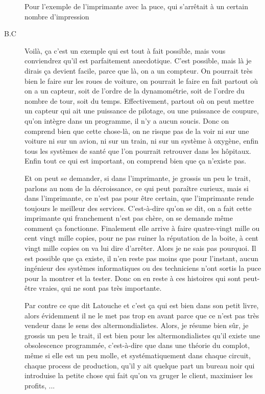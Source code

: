 \begin{description}
Pour l'exemple de l'imprimante avec la puce, qui s'arrêtait à un certain nombre d'impression

\vspace{1\baselineskip}

\item[B.C]Voilà, ça c'est un exemple qui est tout à fait possible, mais vous conviendrez qu'il est parfaitement anecdotique. C'est possible, mais là je dirais ça devient facile, parce que là, on a un compteur. On pourrait très bien le faire sur les roues de voiture, on pourrait le faire en fait partout où on a un capteur, soit de l'ordre de la dynamométrie, soit de l'ordre du nombre de tour, soit du temps. Effectivement, partout où on peut mettre un capteur qui ait une puissance de pilotage, ou une puissance de coupure, qu'on intègre dans un programme, il n'y a aucun soucis. Donc on comprend bien que cette chose-là, on ne risque pas de la voir ni sur une voiture ni sur un avion, ni sur un train, ni sur un système à oxygène, enfin tous les systèmes de santé que l'on pourrait retrouver dans les hôpitaux. Enfin tout ce qui est important, on comprend bien que ça n'existe pas.

Et on peut se demander, si dans l'imprimante, je grossis un peu le trait, parlons au nom de la décroissance, ce qui peut paraître curieux, mais si dans l'imprimante, ce n'est pas pour être certain, que l'imprimante rende toujours le meilleur des services. C'est-à-dire qu'on se dit, on a fait cette imprimante qui franchement n'est pas chère, on se demande même comment ça fonctionne. Finalement elle arrive à faire quatre-vingt mille ou cent vingt mille copies, pour ne pas ruiner la réputation de la boite, à cent vingt mille copies on va lui dire d'arrêter. Alors je ne sais pas pourquoi. Il est possible que ça existe, il n'en reste pas moins que pour l'instant, aucun ingénieur des systèmes informatiques ou des techniciens n'ont sortis la puce pour la montrer et la tester. Donc on en reste à ces histoires qui sont peut-être vraies, qui ne sont pas très importante. 

Par contre ce que dit Latouche et c'est ça qui est bien dans son petit livre, alors évidemment il ne le met pas trop en avant parce que ce n’est pas très vendeur dans le sens des altermondialistes. Alors, je résume bien sûr, je grossis un peu le trait, il est bien pour les altermondialistes qu'il existe une obsolescence programmée, c'est-à-dire que dans une théorie du complot, même si elle est un peu molle, et systématiquement dans chaque circuit, chaque process de production, qu'il y ait quelque part un bureau noir qui introduise la petite chose qui fait qu'on va gruger le client, maximiser les profits, ... 


\end{description}
